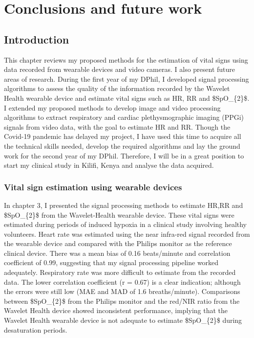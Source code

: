 \setlength{\parskip}{\baselineskip}

\chapter{Conclusions and future work}
\section{Introduction}
This chapter reviews my proposed methods for the estimation of vital signs using data recorded from wearable devices and video cameras. I also present future areas of research. During the first year of my DPhil, I developed signal processing algorithms to assess the quality of the information recorded by the Wavelet Health wearable device and estimate vital signs such as HR, RR and \gls{$SpO_{2}$}. I extended my proposed methods to develop image and video processing algorithms to extract respiratory and cardiac  plethysmographic imaging (PPGi) signals from video data, with the goal to estimate HR and RR. Though the Covid-19 pandemic has delayed my project, I have used this time to acquire all the technical skills needed, develop the required algorithms and lay the ground work for the second year of my DPhil. Therefore, I will be in a great position to start my clinical study in Kilifi, Kenya and analyse the data acquired.

\subsection{Vital sign estimation using wearable devices}
 In chapter 3, I presented the signal processing methods to estimate HR,RR and  \gls{$SpO_{2}$}  from the Wavelet-Health wearable device. These vital signs were estimated during periods of induced hypoxia in a clinical study involving healthy volunteers. Heart rate was estimated using the near infra-red signal recorded from the wearable device and compared with the Philips monitor as the reference clinical device. There was a mean bias of 0.16 beats/minute and correlation coefficient of 0.99, suggesting that my signal processing pipeline worked adequately. Respiratory rate was more difficult to estimate from the recorded data. The lower correlation coefficient (r = 0.67) is a clear indication; although the errors were still low (MAE and MAD of 1.6 breaths/minute). Comparisons between \gls{$SpO_{2}$} from the Philips monitor and the red/NIR ratio from the Wavelet Health device showed inconsistent performance, implying that the Wavelet Health wearable device is not adequate to estimate  \gls{$SpO_{2}$} during desaturation periods.
 
